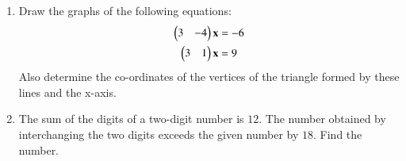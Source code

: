 \renewcommand{\theequation}{\theenumi}
\begin{enumerate}[label=\thesection.\arabic*.,ref=\thesection.\theenumi]

\item Draw the graphs of the following equations: 
\begin{align}\label{linform/2006/2/11/eq:1}
    \begin{pmatrix}3&-4\end{pmatrix}\mathbf{x}&=-6
    \\
\label{linform/2006/2/11/eq:2}
    \begin{pmatrix}3&1\end{pmatrix}\mathbf{x}&=9
\end{align}Also determine the co-ordinates of the vertices of the triangle formed by these lines and the x-axis.
\\
\solution

\item The sum of the digits of a two-digit number is $12$. The number obtained by interchanging the two digits exceeds the given number by $18$. Find the number.
\\
\solution

\end{enumerate}